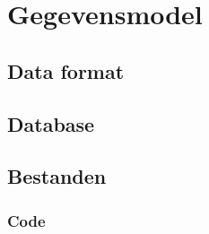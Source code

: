 \section{Gegevensmodel}
\subsection{Data format}
\subsection{Database}
\subsection{Bestanden}
\subsubsection{Code}
